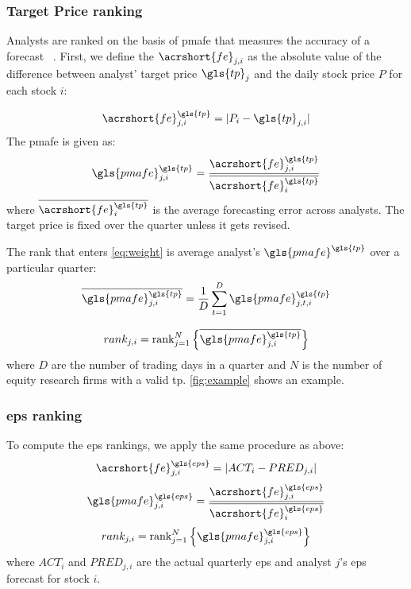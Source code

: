 \documentclass[a4paper,twoside,12pt,openright,notitlepage]{report}\usepackage[]{graphicx}\usepackage[]{color}
\begin{document}
\subsubsection{Target Price ranking}
Analysts are ranked on the basis of \gls{pmafe} that measures the accuracy of a forecast ~\citep{clement1999,brown2001,ertimur2007}. First,  we define the  $\acrshort{fe}_{j,i}$ as the absolute value of the difference between analyst' target price $\gls{tp}_{j}$ and the daily stock price $P$ for each stock $i$:

\begin{equation}
\label{dfe}
\acrshort{fe}_{j,i}^{\gls{tp}}=|{P_{i}-\gls{tp}_{j,i}}|
\end{equation}
The \gls{pmafe} is given as:
\begin{equation}
\label{tp:pmafe}
\gls{pmafe}_{j,i}^{\gls{tp}}=\frac{\acrshort{fe}_{j,i}^{\gls{tp}}}{\overline{\acrshort{fe}_{i}^{\gls{tp}}}}
\end{equation}
where $\overline{\acrshort{fe}_{i}^{\gls{tp}}}$ is the average forecasting error across analysts. The target price is fixed over the quarter unless it gets revised.

The rank  that enters \ref{eq:weight} is average analyst's $\gls{pmafe}^{\gls{tp}}$ over a particular quarter:
\begin{equation}
\overline{\gls{pmafe}_{j,i}^{\gls{tp}}}=\frac{1}{D} \sum_{t=1}^{D} \gls{pmafe}_{j,t,i}^{\gls{tp}}
\end{equation}

\begin{equation}
\label{tp:rank}
rank_{j,i}=\mathrm{rank}_{j=1}^{N} \left\{ \overline{\gls{pmafe}_{j,i}^{\gls{tp}}}\right\}
\end{equation}
where $D$ are the number of trading days in a quarter and $N$ is the number of equity research firms with a valid \gls{tp}. \ref{fig:example} shows an example.


\subsubsection{\gls{eps} ranking}
\label{ch1:sec-eps}
To compute the \gls{eps} rankings, we apply the same procedure as above:
\begin{equation}
\acrshort{fe}_{j,i}^{\gls{eps}}=|{ACT_{i}-PRED_{j,i}}|
\end{equation}
\begin{equation}
\gls{pmafe}_{j,i}^{\gls{eps}}= \frac{\acrshort{fe}_{j,i}^{\gls{eps}}}{\overline{\acrshort{fe}_{i}^{\gls{eps}}}}
\end{equation}
\begin{equation}
\label{ch1-eps:rank}
rank_{j,i}=\mathrm{rank}_{j=1}^{N} \left\{\gls{pmafe}_{j,i}^{\gls{eps}} \right\}
\end{equation}
where $ACT_{i}$ and $PRED_{j,i}$ are the actual quarterly \gls{eps} and  analyst $j$'s \gls{eps} forecast for stock $i$.
\end{document}
